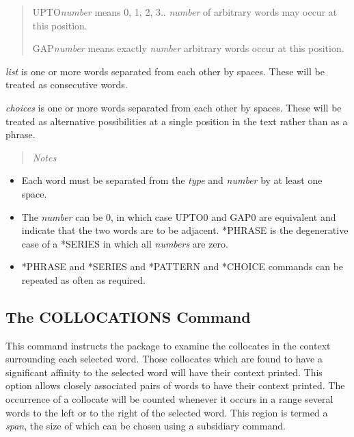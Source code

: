\begin{quote}
UPTO{\em number} means 0, 1, 2, 3.. {\em number} of arbitrary words may
occur at this position.

GAP{\em number} means exactly {\em number} arbitrary words occur at
this position.
\end{quote}

{\em list} is one or more words separated from each other by spaces.
These will be treated as consecutive words.

{\em choices} is one or more words separated from each other by spaces.
These will be treated as alternative possibilities at a single position
in the text rather than as a phrase.

\begin{quote}
{\em Notes}
\end{quote}
\begin{itemize}
\item   Each word must be separated from the {\em type} and {\em number} by at
least one space.

\item   The {\em number} can be 0, in which case UPTO0 and GAP0 are equivalent
and indicate that the two words are to be adjacent.  *PHRASE
is the degenerative case of a *SERIES in which all {\em numbers} are
zero.

\item   *PHRASE and *SERIES and *PATTERN and *CHOICE commands can be
repeated as often as required.
\end{itemize}

\subsection{The COLLOCATIONS Command}
This command instructs the package to examine the collocates in
the context surrounding each selected word.  Those collocates which
are found to have a significant affinity to the selected word will have
their context printed.  This option allows closely associated pairs
of words to have their context printed.  The occurrence of a collocate
will be counted whenever it occurs in a range several words to the left
or to the right of the selected word.  This region is termed a {\em span},
the size of which can be chosen using a subsidiary command.

